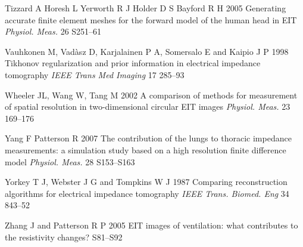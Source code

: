 \documentclass[12pt]{iopart}
\begin{document}
\item[]
Tizzard A Horesh L Yerworth R J Holder D S Bayford R H 2005
Generating accurate finite element meshes for the forward
model of the human head in EIT
{\em Physiol. Meas.}
 26 S251--61 

\item[]
Vauhkonen M, Vad\`asz D, Karjalainen P A, Somersalo E and
Kaipio J P 1998
 Tikhonov regularization and prior information in
electrical impedance tomography
 {\em IEEE Trans Med Imaging}
17 285--93

\item[]
Wheeler JL, Wang W, Tang M 2002
A comparison of methods for measurement of spatial resolution in two-dimensional circular EIT images
{\em Physiol. Meas.}
23 169--176

\item[]
Yang F  Patterson R 2007
The contribution of the lungs to thoracic impedance
measurements: a simulation study based on a high
resolution finite difference model
{\em Physiol. Meas.}
28 S153--S163

\item[]
Yorkey T J, Webster J G and Tompkins W J 1987
Comparing reconstruction algorithms for electrical
impedance tomography
{\em IEEE Trans. Biomed. Eng}
34 843--52


\item[]
Zhang J and Patterson R P 2005 EIT images of ventilation: what
contributes to the resistivity changes?  S81--S92

\endrefs
\end{document}
